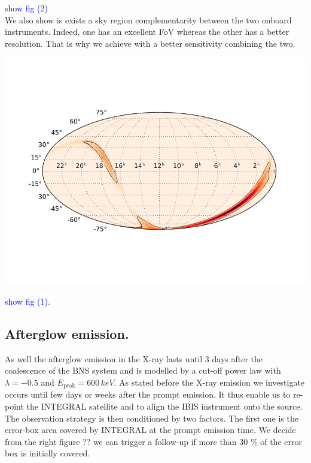 \documentclass[a0,portrait]{a0poster}
\begin{document}
\begin{multicols}{2}
\textcolor{blue}{show fig (2)} \\
 
\indent We also show is exists a sky region complementarity between the two onboard instruments. Indeed, one has an excellent FoV whereas the other has a better resolution. That is why we achieve with a better sensitivity combining the two. 

\begin{center}\vspace{.5cm}
    \includegraphics[scale=1.]{figures/test.png}
    \label{spectra}
\end{center}

\textcolor{blue}{show fig (1)}.


\subsection*{Afterglow emission.}


As well the afterglow emission in the X-ray lasts until 3 days after the coalescence of the BNS system and is modelled by a cut-off power law with $\lambda = - 0.5$ and $E_{\mathrm{peak}} = 600 \, keV$. As stated before the X-ray emission we investigate occurs until few days or weeks after the prompt emission. It thus enable us to re-point the INTEGRAL satellite and to align the IBIS instrument onto the source. The observation strategy is then conditioned by two factors. The first one is the error-box area covered by INTEGRAL at the prompt emission time. We decide from the right figure ?? we can trigger a follow-up if more than 30 \% of the error box is initially covered.


\end{multicols}
\end{document}
